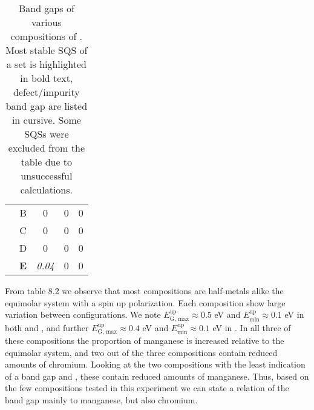 \begin{table}[H]
\begin{tabular}{@{}ccccc@{}}
\multicolumn{1}{c|}{}                                       & B          & 0                                                                           & 0                                                                           & 0                                                                                 \\
\multicolumn{1}{c|}{}                                       & C          & 0                                                                           & 0                                                                           & 0                                                                                 \\
\multicolumn{1}{c|}{}                                       & D          & 0                                                                           & 0                                                                           & 0                                                                                 \\
\multicolumn{1}{c|}{}                                       & \textbf{E} & \textit{0.04}                                                               & 0                                                                           & 0                                                                                 \\ \bottomrule 
\end{tabular}
\caption{Band gaps of various compositions of . Most stable SQS of a set is highlighted in bold text, defect/impurity band gap are listed in cursive. Some SQSs were excluded from the table due to unsuccessful calculations.}
\end{table}

From table 8.2 we observe that most compositions are half-metals alike the equimolar system with a spin up polarization. Each composition show large variation between configurations. We note $E_\text{G, max} ^\text{up} \approx 0.5$ eV and $E_\text{min} ^\text{up} \approx 0.1$ eV in both  and , and further $E_\text{G, max} ^\text{up} \approx 0.4$ eV and $E_\text{min} ^\text{up} \approx 0.1$ eV in . In all three of these compositions the proportion of manganese is increased relative to the equimolar system, and two out of the three compositions contain reduced amounts of chromium. Looking at the two compositions with the least indication of a band gap  and , these contain reduced amounts of manganese. Thus, based on the few compositions tested in this experiment we can state a relation of the band gap mainly to manganese, but also chromium.     


